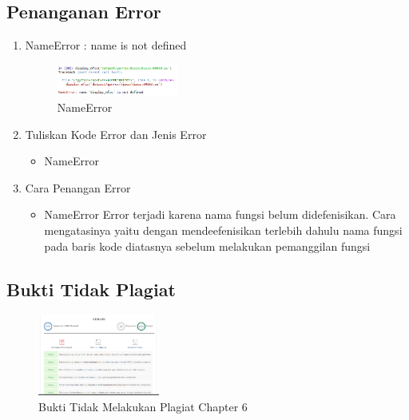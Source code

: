 \subsection{Penanganan Error}
\begin{enumerate}
	\item NameError : name is not defined
	\begin{figure}[H]
		\includegraphics[width=4cm]{figures/1174096/tugas6/error.PNG}
		\centering
		\caption{NameError}
	\end{figure}
	\item Tuliskan Kode Error dan Jenis Error
	\begin{itemize}
		\item NameError
	\end{itemize}
	\item Cara Penangan Error
	\begin{itemize}
		\item NameError
		\hfill\break
		Error terjadi karena nama fungsi belum didefenisikan. Cara mengatasinya yaitu dengan mendeefenisikan terlebih dahulu nama fungsi pada baris kode diatasnya sebelum melakukan pemanggilan fungsi
	\end{itemize}
\end{enumerate}

\subsection{Bukti Tidak Plagiat}
\begin{figure}[H]
\centering
	\includegraphics[width=4cm]{figures/1174096/tugas6/Plagiarisme.PNG}
	\caption{Bukti Tidak Melakukan Plagiat Chapter 6}
\end{figure}
